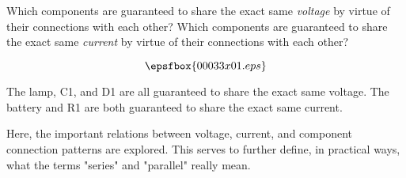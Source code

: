 

Which components are guaranteed to share the exact same {\it voltage} by virtue of their connections with each other?  Which components are guaranteed to share the exact same {\it current} by virtue of their connections with each other?

$$\epsfbox{00033x01.eps}$$







The lamp, C1, and D1 are all guaranteed to share the exact same voltage.  The battery and R1 are both guaranteed to share the exact same current.







Here, the important relations between voltage, current, and component connection patterns are explored.  This serves to further define, in practical ways, what the terms "series" and "parallel" really mean.




